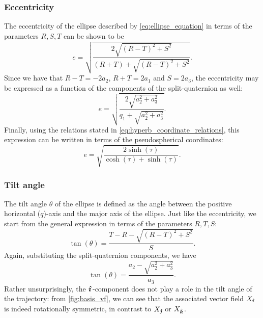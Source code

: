 \subsubsection{Eccentricity} The eccentricity of the ellipse described by \cref{eq:ellipse_equation} in terms of the parameters \(R, S, T\) can be shown to be \cite{Rapp1991}
\begin{equation}
    e = \sqrt{\frac{2\sqrt{(R - T)^2 + S^2}}{(R + T) + \sqrt{(R - T)^2 + S^2}}}.
    \label{eq:eccentricity}
\end{equation}
Since we have that \(R - T = -2a_2\), \(R + T = 2a_1\) and \(S = 2a_3\), the eccentricity may be expressed as a function of the components of the split-quaternion as well:
\begin{equation}
    e = \sqrt{\frac{2\sqrt{a_2^2 + a_3^2}}{q_1 + \sqrt{a_2^2 + a_3^2}}}.
\end{equation}
Finally, using the relations stated in \cref{eq:hyperb_coordinate_relations}, this expression can be written in terms of the pseudospherical coordinates:
\begin{equation}
    e = \sqrt{\frac{2\sinh(\tau)}{\cosh(\tau) + \sinh(\tau)}}. 
    \label{eq:e_pseudosphere_coords}
\end{equation}

\subsubsection{Tilt angle} The tilt angle \(\theta\) of the ellipse is defined as the angle between the positive horizontal (\(q\))-axis and the major axis of the ellipse. Just like the eccentricity, we start from the general expression in terms of the parameters \(R, T, S\):
\begin{equation}
    \tan(\theta) = \frac{T - R - \sqrt{(R - T)^2 + S^2}}{S}.
\end{equation}
Again, substituting the split-quaternion components, we have
\begin{equation}
    \tan(\theta) = \frac{a_2 - \sqrt{a_2^2 + a_3^2}}{a_3}.
    \label{eq:tilt_angle}
\end{equation}
Rather unsurprisingly, the \(\quati\)-component does not play a role in the tilt angle of the trajectory: from \cref{fig:basis_vf}, we can see that the associated vector field \(X_\quati\) is indeed rotationally symmetric, in contrast to \(X_\quatj\) or \(X_\quatk\).

